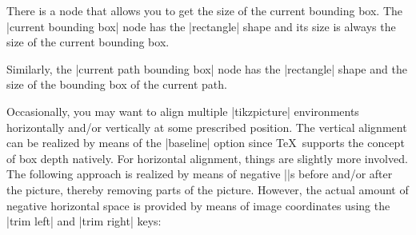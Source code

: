 There is a node that allows you to get the size of the current
bounding box. The |current bounding box| node has the |rectangle|
shape and its size is always the size of the current
bounding box.

Similarly, the |current path bounding box| node has the |rectangle|
shape and the size of the bounding box of the current path.


\begin{codeexample}[]
\end{codeexample}


Occasionally, you may want to align multiple |tikzpicture| environments horizontally and/or vertically at some prescribed position. The vertical alignment can be realized by means of the |baseline| option since \TeX\ supports the concept of box depth natively. For horizontal alignment, things are slightly more involved. The following approach is realized by means of negative |\hspace|s before and/or after the picture, thereby removing parts of the picture. However, the actual amount of negative horizontal space is provided by means of image coordinates using the |trim left| and |trim right| keys:

